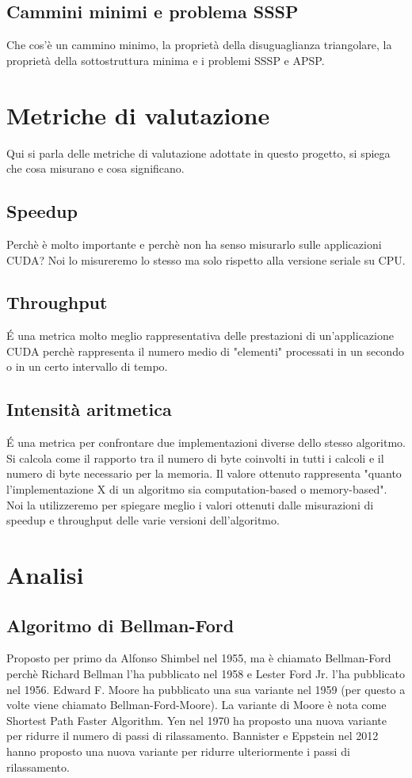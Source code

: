 \documentclass[a4paper]{article}
\begin{document}
	\subsection{Cammini minimi e problema SSSP}
	Che cos'è un cammino minimo, la proprietà della disuguaglianza triangolare, la proprietà della sottostruttura minima e i problemi SSSP e APSP.
	
	\section{Metriche di valutazione}
	\label{section:metriche}
	Qui si parla delle metriche di valutazione adottate in questo progetto, si spiega che cosa misurano e cosa significano.
	
	\subsection{Speedup}
	Perchè è molto importante e perchè non ha senso misurarlo sulle applicazioni CUDA? Noi lo misureremo lo stesso ma solo rispetto alla versione seriale su CPU.
	
	\subsection{Throughput}
	\'E una metrica molto meglio rappresentativa delle prestazioni di un'applicazione CUDA perchè rappresenta il numero medio di "elementi" processati in un secondo o in un certo intervallo di tempo.
	
	\subsection{Intensità aritmetica}
	\'E una metrica per confrontare due implementazioni diverse dello stesso algoritmo. Si calcola come il rapporto tra il numero di byte coinvolti in tutti i calcoli e il numero di byte necessario per la memoria. Il valore ottenuto rappresenta "quanto l'implementazione X di un algoritmo sia computation-based o memory-based". Noi la utilizzeremo per spiegare meglio i valori ottenuti dalle misurazioni di speedup e throughput delle varie versioni dell'algoritmo.
	
	\section{Analisi}
	\label{section:analisi}
	\subsection{Algoritmo di Bellman-Ford}
	Proposto per primo da Alfonso Shimbel nel 1955, ma è chiamato Bellman-Ford perchè Richard Bellman l'ha pubblicato nel 1958 e Lester Ford Jr. l'ha pubblicato nel 1956. Edward F. Moore ha pubblicato una sua variante nel 1959 (per questo a volte viene chiamato Bellman-Ford-Moore). La variante di Moore è nota come Shortest Path Faster Algorithm. Yen nel 1970 ha proposto una nuova variante per ridurre il numero di passi di rilassamento. Bannister e Eppstein nel 2012 hanno proposto una nuova variante per ridurre ulteriormente i passi di rilassamento.
	
\end{document}
